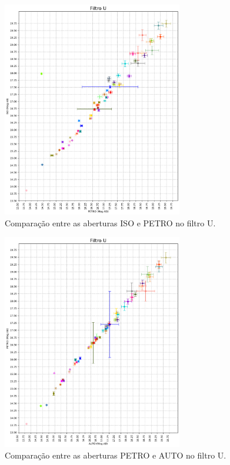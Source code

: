 \begin{figure}
  \centering 
  \includegraphics[width=0.7\textwidth]{Imagens/iso_petro.png} 
  \caption[Comparação entre as aberturas ISO e PETRO no filtro U.]{Comparação entre as aberturas ISO e PETRO no filtro U.}
  \label{fig:iso_petro}
\end{figure}

\begin{figure}
  \centering 
  \includegraphics[width=0.7\textwidth]{Imagens/auto_petro.png} 
  \caption[Comparação entre as aberturas PETRO e AUTO no filtro U.]{Comparação entre as aberturas PETRO e AUTO no filtro U.}
  \label{fig:auto_petro} 
\end{figure}

